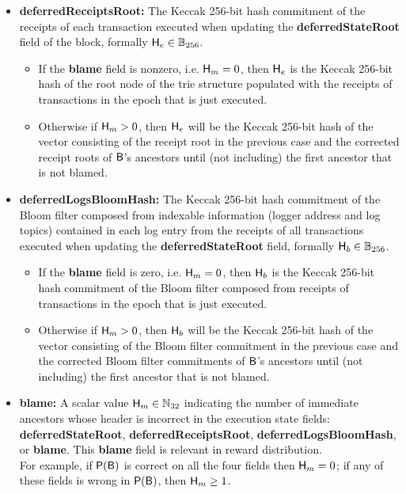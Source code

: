 \begin{itemize}[nosep]
	

	\item {\bf deferredReceiptsRoot:} The Keccak 256-bit hash commitment of the receipts of each transaction executed when updating the {\bf deferredStateRoot} field of the block, formally $\textsf{H}_e\in\mathbb{B}_{256}$. 
	\begin{itemize}
		\item If the {\bf blame} field is nonzero, i.e. $\textsf{H}_m=0$, then $\textsf{H}_e$ is the Keccak 256-bit hash of the root node of the trie structure populated with the receipts of transactions in the epoch that is just executed.
		
		\item Otherwise if $\textsf{H}_m>0$, then $\textsf{H}_e$ will be the Keccak 256-bit hash of the vector consisting of the receipt root in the previous case and the corrected receipt roots of $\textsf{B}$'s ancestors until (not including) the first ancestor that is not blamed.
	\end{itemize}
	
	 


	\item {\bf deferredLogsBloomHash:} The Keccak 256-bit hash commitment of the Bloom filter composed from indexable information (logger address and log topics) contained in each log entry from the receipts of all transactions executed when updating the {\bf deferredStateRoot} field, formally $\textsf{H}_b\in\mathbb{B}_{256}$.
	\begin{itemize}
		\item If the {\bf blame} field is zero, i.e. $\textsf{H}_m=0$, then $\textsf{H}_b$ is the Keccak 256-bit hash commitment of the Bloom filter composed from receipts of transactions in the epoch that is just executed.
	
		\item Otherwise if $\textsf{H}_m>0$, then $\textsf{H}_b$ will be the Keccak 256-bit hash of the vector consisting of the Bloom filter commitment in the previous case and the corrected Bloom filter commitments of $\textsf{B}$'s ancestors until (not including) the first ancestor that is not blamed.
	\end{itemize}

	\item {\bf blame:} A scalar value $\textsf{H}_{m}\in\mathbb{N}_{32}$ indicating the number of immediate ancestors whose header is incorrect in the execution state fields: {\bf deferredStateRoot}, {\bf deferredReceiptsRoot}, {\bf deferredLogsBloomHash}, or {\bf blame}. 
	This {\bf blame} field is relevant in reward distribution.\\
	For example, if $\mathsf{P}{\left({\textsf{B}} \right)}$ is correct on all the four fields then $\textsf{H}_{m}=0$; if any of these fields is wrong in $\mathsf{P}{\left({\textsf{B}} \right)}$, then $\textsf{H}_{m} \ge 1$.



\end{itemize}
